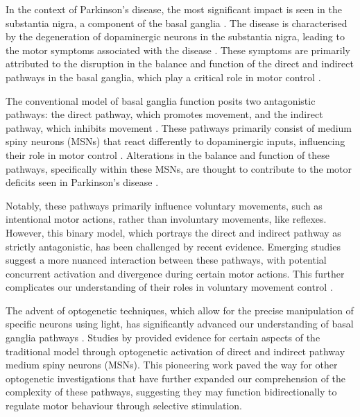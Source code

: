\documentclass[10pt]{article}
\begin{document}
\begin{sloppypar}
  In the context of Parkinson’s disease, the most significant impact is seen in the substantia nigra, a component of the basal ganglia \citep{abedini_cooccurrence_2015}. The disease is characterised by the degeneration of dopaminergic neurons in the substantia nigra, leading to the motor symptoms associated with the disease \citep{abedini_cooccurrence_2015}. These symptoms are primarily attributed to the disruption in the balance and function of the direct and indirect pathways in the basal ganglia, which play a critical role in motor control \cite{abedini_cooccurrence_2015,ojagbemi_neuropsychiatric_2013}.

  The conventional model of basal ganglia function posits two antagonistic pathways: the direct pathway, which promotes movement, and the indirect pathway, which inhibits movement \citep{isett_indirect_2022}. These pathways primarily consist of medium spiny neurons (MSNs) that react differently to dopaminergic inputs, influencing their role in motor control \citep{isett_indirect_2022}. Alterations in the balance and function of these pathways, specifically within these MSNs, are thought to contribute to the motor deficits seen in Parkinson’s disease \citep{cui_concurrent_2013}.

  Notably, these pathways primarily influence voluntary movements, such as intentional motor actions, rather than involuntary movements, like reflexes. However, this binary model, which portrays the direct and indirect pathway as strictly antagonistic, has been challenged by recent evidence. Emerging studies suggest a more nuanced interaction between these pathways, with potential concurrent activation and divergence during certain motor actions. This further complicates our understanding of their roles in voluntary movement control \citep{perez_striatal_2017}.

  The advent of optogenetic techniques, which allow for the precise manipulation of specific neurons using light, has significantly advanced our understanding of basal ganglia pathways \citep{kravitz_regulation_2010, cui_concurrent_2013}. Studies by \cite{kravitz_regulation_2010} provided evidence for certain aspects of the traditional model through optogenetic activation of direct and indirect pathway medium spiny neurons (MSNs). This pioneering work paved the way for other optogenetic investigations that have further expanded our comprehension of the complexity of these pathways, suggesting they may function bidirectionally \citep{yttri_opponent_2016} to regulate motor behaviour through selective stimulation.


\end{sloppypar}
\end{document}

